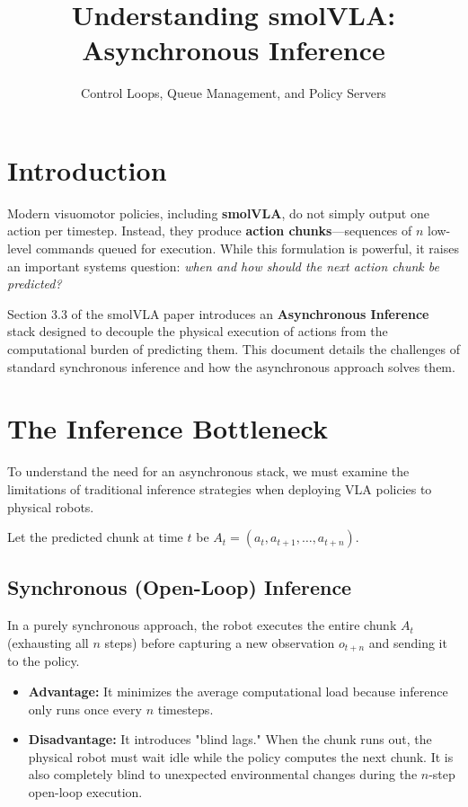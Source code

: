 \documentclass[11pt,a4paper]{article}
\title{\textbf{Understanding smolVLA: Asynchronous Inference}}
\author{Control Loops, Queue Management, and Policy Servers}
\date{\vspace{-5ex}}
\begin{document}
\maketitle

\section{Introduction}
Modern visuomotor policies, including \textbf{smolVLA}, do not simply output one action per timestep. Instead, they produce \textbf{action chunks}---sequences of $n$ low-level commands queued for execution. While this formulation is powerful, it raises an important systems question: \textit{when and how should the next action chunk be predicted?}

Section 3.3 of the smolVLA paper introduces an \textbf{Asynchronous Inference} stack designed to decouple the physical execution of actions from the computational burden of predicting them. This document details the challenges of standard synchronous inference and how the asynchronous approach solves them.

\section{The Inference Bottleneck}
To understand the need for an asynchronous stack, we must examine the limitations of traditional inference strategies when deploying VLA policies to physical robots. 

Let the predicted chunk at time $t$ be $A_t = (a_t, a_{t+1}, \dots, a_{t+n})$.

\subsection{Synchronous (Open-Loop) Inference}
In a purely synchronous approach, the robot executes the entire chunk $A_t$ (exhausting all $n$ steps) before capturing a new observation $o_{t+n}$ and sending it to the policy.
\begin{itemize}
    \item \textbf{Advantage:} It minimizes the average computational load because inference only runs once every $n$ timesteps.
    \item \textbf{Disadvantage:} It introduces "blind lags." When the chunk runs out, the physical robot must wait idle while the policy computes the next chunk. It is also completely blind to unexpected environmental changes during the $n$-step open-loop execution.
\end{itemize}
\end{document}
